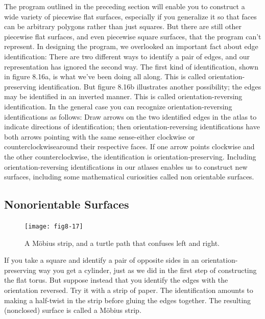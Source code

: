 \documentclass{book}
\begin{document}
The program outlined in the preceding section will enable you to construct a wide variety of piecewise flat surfaces, especially if you generalize
it so that faces can be arbitrary polygons rather than just squares. But
there are still other piecewise flat surfaces, and even piecewise square
surfaces, that the program can't represent. In designing the program,
we overlooked an important fact about edge identification: There are
two different ways to identify a pair of edges, and our representation
has ignored the second way. The first kind of identification, shown
in figure 8.16a, is what we've been doing all along. This is called
orientation-preserving identification. But figure 8.16b illustrates another
possibility; the edges may be identified in an inverted manner. This
is called orientation-reversing identification. In the general case you
can recognize orientation-reversing identifications as follows: Draw arrows on the two identified edges in the atlas to indicate directions of
identification; then orientation-reversing identifications have both arrows
pointing with the same sense-either clockwise or counterclockwisearound their respective faces. If one arrow points clockwise and the other
counterclockwise, the identification is orientation-preserving. Including
orientation-reversing identifications in our atlases enables us to construct
new surfaces, including some mathematical curiosities called non orientable surfaces.

\subsection{Nonorientable Surfaces}

\begin{figure}
\begin{center}
\texttt{[image: fig8-17]}
\caption{A M\"obius strip, and a turtle path that confuses left and right.}
\end{center}
\end{figure}

If you take a square and identify a pair of opposite sides in an orientation-preserving way you get a cylinder, just as we did in the first step of
constructing the flat torus. But suppose instead that you identify the
edges with the orientation reversed. Try it with a strip of paper. The
identification amounts to making a half-twist in the strip before gluing
the edges together. The resulting (nonclosed) surface is called a M\"obius
strip.
\end{document}
